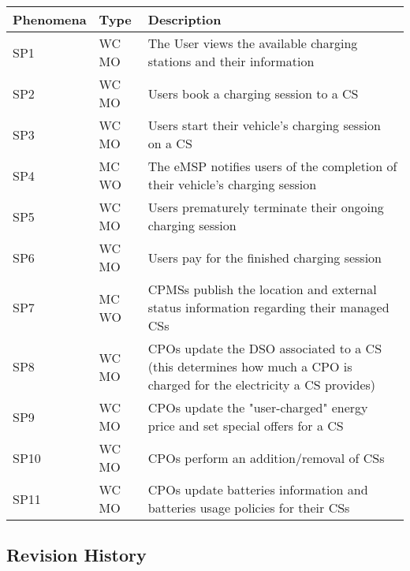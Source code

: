 \documentclass[12pt]{article}
\begin{document}
\begin{table}[H]
    \centering
    \setlength{\tabcolsep}{18pt}
    \renewcommand{\arraystretch}{1.2}
    \begin{tabularx}{\textwidth}{|>{\centering\hsize=0.3\hsize}X|>{\centering\hsize=0.3\hsize}X|>{\hsize=1.4\hsize}X|}
        \hline
        \textbf{Phenomena} & \textbf{Type} & \textbf{Description} \\
        \hline
        SP1 & WC MO & The User views the available charging stations and their information \\
        \hline
        SP2 & WC MO & Users book a charging session to a CS \\
        \hline
        SP3 & WC MO & Users start their vehicle's charging session on a CS \\
        \hline
        SP4 & MC WO & The eMSP notifies users of the completion of their vehicle's charging session \\
        \hline
        SP5 & WC MO & Users prematurely terminate their ongoing charging session \\
        \hline
        SP6 & WC MO & Users pay for the finished charging session \\
        \hline
        SP7 & MC WO & CPMSs publish the location and external status information regarding their managed CSs \\
        \hline
        SP8 & WC MO & CPOs update the DSO associated to a CS (this determines how much a CPO is charged for the electricity a CS provides) \\
        \hline
        SP9 & WC MO & CPOs update the "user-charged" energy price and set special offers for a CS \\
        \hline
        SP10 & WC MO & CPOs perform an addition/removal of CSs \\
        \hline
        SP11 & WC MO & CPOs update batteries information and batteries usage policies for their CSs \\
        \hline
    \end{tabularx}
    \label{tab:shared_phenomena}
\end{table}

\subsection{Revision History}
\end{document}
